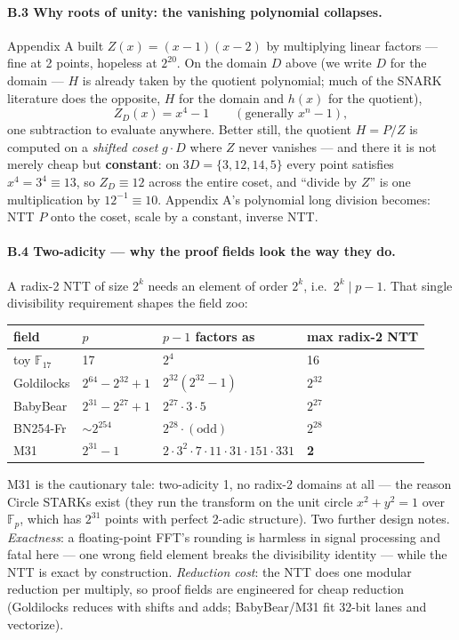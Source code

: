 \documentclass[10pt]{article}
\begin{document}
\paragraph{B.3 Why roots of unity: the vanishing polynomial
collapses.} Appendix A built $Z(x) = (x-1)(x-2)$ by multiplying
linear factors --- fine at 2 points, hopeless at $2^{20}$. On the
domain $D$ above (we write $D$ for the domain --- $H$ is
already taken by the quotient polynomial; much of the SNARK
literature does the opposite, $H$ for the domain and $h(x)$ for
the quotient),
\[
Z_D(x) = x^4 - 1 \qquad (\text{generally } x^n - 1),
\]
one subtraction to evaluate anywhere. Better still, the quotient
$H = P/Z$ is computed on a \emph{shifted coset} $g\cdot D$ where
$Z$ never vanishes --- and there it is not merely cheap but
\textbf{constant}: on $3D = \{3, 12, 14, 5\}$ every point satisfies
$x^4 = 3^4 \equiv 13$, so $Z_D \equiv 12$ across the entire coset,
and ``divide by $Z$'' is one multiplication by $12^{-1} \equiv 10$.
Appendix A's polynomial long division becomes: NTT $P$ onto the
coset, scale by a constant, inverse NTT.

\paragraph{B.4 Two-adicity --- why the proof fields look the way
they do.} A radix-2 NTT of size $2^k$ needs an element of order
$2^k$, i.e.\ $2^k \mid p-1$. That single divisibility requirement
shapes the field zoo:
\begin{center}
\begin{tabular}{llll}
field & $p$ & $p-1$ factors as & max radix-2 NTT\\
\hline
toy $\mathbb{F}_{17}$ & 17 & $2^4$ & 16\\
Goldilocks & $2^{64}{-}2^{32}{+}1$ & $2^{32}(2^{32}{-}1)$ & $2^{32}$\\
BabyBear & $2^{31}{-}2^{27}{+}1$ & $2^{27}\cdot3\cdot5$ & $2^{27}$\\
BN254-Fr & ${\sim}2^{254}$ & $2^{28}\cdot(\text{odd})$ & $2^{28}$\\
M31 & $2^{31}{-}1$ & $2\cdot3^2\cdot7\cdot11\cdot31\cdot151\cdot331$
 & \textbf{2}\\
\end{tabular}
\end{center}
M31 is the cautionary tale: two-adicity 1, no radix-2 domains at
all --- the reason Circle STARKs \cite{circle} exist (they run the
transform on the unit circle $x^2 + y^2 = 1$ over $\mathbb{F}_p$,
which has $2^{31}$ points with perfect 2-adic structure). Two
further design notes. \emph{Exactness}: a floating-point FFT's
rounding is harmless in signal processing and fatal here --- one
wrong field element breaks the divisibility identity --- while the
NTT is exact by construction. \emph{Reduction cost}: the NTT does
one modular reduction per multiply, so proof fields are engineered
for cheap reduction (Goldilocks reduces with shifts and adds;
BabyBear/M31 fit 32-bit lanes and vectorize).
\end{document}
